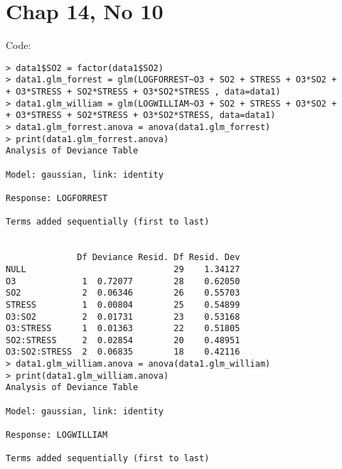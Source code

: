 \documentclass[a4paper,10pt]{article}
\begin{document}
\section{Chap 14, No 10}
Code:
\begin{verbatim}
> data1$SO2 = factor(data1$SO2)
> data1.glm_forrest = glm(LOGFORREST~O3 + SO2 + STRESS + O3*SO2 +
+ O3*STRESS + SO2*STRESS + O3*SO2*STRESS , data=data1)
> data1.glm_william = glm(LOGWILLIAM~O3 + SO2 + STRESS + O3*SO2 +
+ O3*STRESS + SO2*STRESS + O3*SO2*STRESS, data=data1)
> data1.glm_forrest.anova = anova(data1.glm_forrest)
> print(data1.glm_forrest.anova)
Analysis of Deviance Table

Model: gaussian, link: identity

Response: LOGFORREST

Terms added sequentially (first to last)


              Df Deviance Resid. Df Resid. Dev
NULL                             29    1.34127
O3             1  0.72077        28    0.62050
SO2            2  0.06346        26    0.55703
STRESS         1  0.00804        25    0.54899
O3:SO2         2  0.01731        23    0.53168
O3:STRESS      1  0.01363        22    0.51805
SO2:STRESS     2  0.02854        20    0.48951
O3:SO2:STRESS  2  0.06835        18    0.42116
> data1.glm_william.anova = anova(data1.glm_william)
> print(data1.glm_william.anova)
Analysis of Deviance Table

Model: gaussian, link: identity

Response: LOGWILLIAM

Terms added sequentially (first to last)



\end{verbatim}
\end{document}
